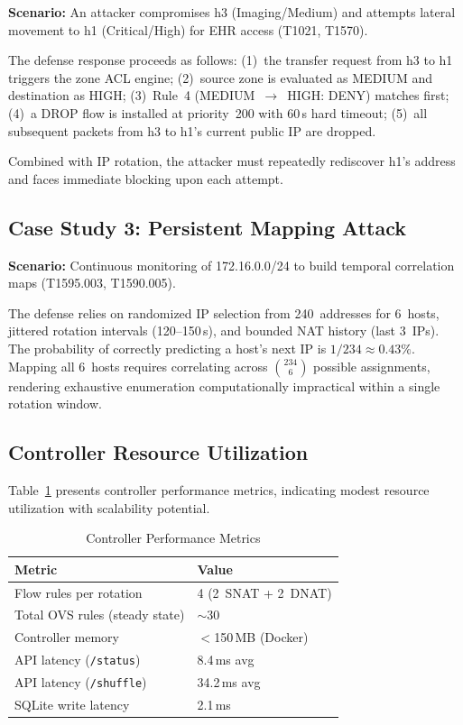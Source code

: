 \documentclass[conference]{IEEEtran}
\begin{document}
\textbf{Scenario:} An attacker compromises h3 (Imaging/Medium) and attempts lateral movement to h1 (Critical/High) for EHR access (T1021, T1570).

The defense response proceeds as follows: (1)~the transfer request from h3 to h1 triggers the zone ACL engine; (2)~source zone is evaluated as MEDIUM and destination as HIGH; (3)~Rule~4 (MEDIUM~$\rightarrow$~HIGH: DENY) matches first; (4)~a DROP flow is installed at priority~200 with 60\,s hard timeout; (5)~all subsequent packets from h3 to h1's current public IP are dropped.

Combined with IP rotation, the attacker must repeatedly rediscover h1's address and faces immediate blocking upon each attempt.

\subsection{Case Study 3: Persistent Mapping Attack}

\textbf{Scenario:} Continuous monitoring of 172.16.0.0/24 to build temporal correlation maps (T1595.003, T1590.005).

The defense relies on randomized IP selection from 240~addresses for 6~hosts, jittered rotation intervals (120--150\,s), and bounded NAT history (last 3~IPs). The probability of correctly predicting a host's next IP is $1/234 \approx 0.43\%$. Mapping all 6~hosts requires correlating across $\binom{234}{6}$ possible assignments, rendering exhaustive enumeration computationally impractical within a single rotation window.

\subsection{Controller Resource Utilization}

Table~\ref{tab:controller} presents controller performance metrics, indicating modest resource utilization with scalability potential.

\begin{table}[htbp]
\caption{Controller Performance Metrics}
\label{tab:controller}
\centering
\footnotesize
\begin{tabular}{ll}
\toprule
\textbf{Metric} & \textbf{Value} \\
\midrule
Flow rules per rotation & 4 (2~SNAT + 2~DNAT) \\
Total OVS rules (steady state) & $\sim$30 \\
Controller memory & $<$150\,MB (Docker) \\
API latency (\texttt{/status}) & 8.4\,ms avg \\
API latency (\texttt{/shuffle}) & 34.2\,ms avg \\
SQLite write latency & 2.1\,ms \\
\bottomrule
\end{tabular}
\end{table}
\end{document}
